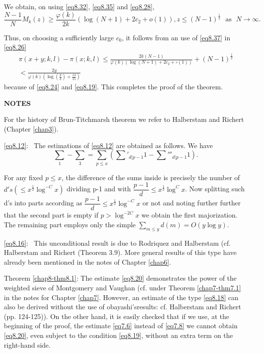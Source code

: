 We obtain, on using \eqref{eq8.32}, \eqref{eq8.35} and \eqref{eq8.28},
\begin{equation*}
\frac{N-1}{N}M_k(z) \geq \frac{\varphi(k)}{2k}(\log (N+1) + 2c_2 +
o(1)), z \leq (N-1)^{\frac{1}{2}} \text{~ as~ } N \to
\infty. \tag{8.37}\label{eq8.37}  
\end{equation*}

Thus, on choosing a sufficiently large $c_0$, it follows from an use
of \eqref{eq8.37} in \eqref{eq8.26} 
\begin{gather*}
\pi (x+y; k, l)-\pi(x;k,l) \leq \frac{2k (N-1)}{\varphi(k)(\log
  (N+1)+2c_2+ \circ (1))}+(N-1)^{\frac{1}{2}}\\
< \frac{2y}{\varphi(k)(\log
  (\frac{y}{k})+\frac{13}{15})}\tag{8.38}\label{eq8.38} 
\end{gather*}
because of \eqref{eq8.24} and \eqref{eq8.19}. This completes the proof
of the theorem. 

\medskip
\begin{center}
\textbf{NOTES}
\end{center}

For the history of Brun-Titchmarsh theorem we refer to Halberstam and
Richert \cite{key1} (Chapter \ref{chap3}). 

\eqref{eq8.12}:~ The estimations of \eqref{eq8.12} are obtained as
follows. We have  
\begin{equation*}
\sum_1 - \sum_3 = \sum_{p \leq x}\left(\sum'_{d |p-1}1-\sum'''_{d
  |p-1}1\right).\tag{8.39}\label{eq8.39} 
\end{equation*}

For any fixed $p \leq x$, the difference of the sums inside is
precisely the number of $d's(\leq x^{\frac{1}{2}}\log^{-C}x)$
dividing p-1 and with $\dfrac{p-1}{d}\leq x^{\frac{1}{2}} \log^C
x$. Now splitting such d's into parts according as $\dfrac{p-1}{d}\leq
x^{\frac{1}{2}} \log^{-C} x$ or not and noting further further that the
second part is empty if $p > \log^{-2C}x$ we obtain the first
majorization. The remaining part employs only the simple  $\sum
\limits_{m \leq y} d(m) = O(y \log y)$. 

\eqref{eq8.16}:~ This unconditional result is due to Rodriquez
\cite{key1} and Halberstam \cite{key1} (cf. Halberstam and Richert
     \cite{key1} (Theorem 3.9). More general results of
     this type have already been mentioned in the notes of Chapter
     \ref{chap6}.  



Theorem \ref{chap8-thm8.1}:
The estimate \eqref{eq8.20} demonstrates the power of the weighted
sieve of Montgomery and Vaughan (cf. under Theorem \ref{chap7-thm7.1}
in the notes for Chapter \ref{chap7}. However, an estimate of the type
\eqref{eq8.18} can also be derived without the use of
obayashi's\pageoriginale results: cf. Halberstam and Richert
\cite{key1} (pp. 124-125)). On the other hand, it is easily checked that if
we use, at the beginning of the proof, the estimate \eqref{eq7.6} instead of
\eqref{eq7.8} we cannot obtain \eqref{eq8.20}, even subject to the condition
\eqref{eq8.19}, without an extra term on the right-hand side. 

